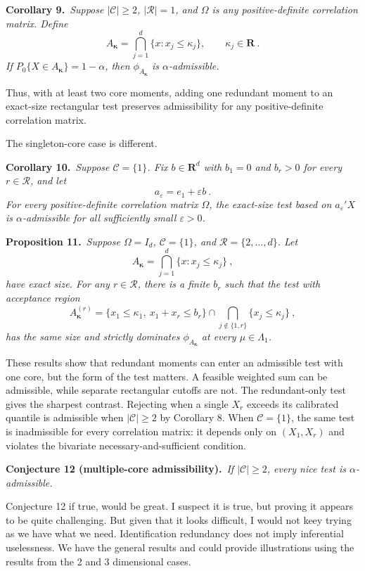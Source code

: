 \documentclass[11pt]{article}
\newcommand{\R}{\mathbf R}
\newcommand{\cC}{\mathcal C}
\newcommand{\cR}{\mathcal R}
\newcommand{\1}{\mathbf 1}
\newcommand{\result}[2]{%
  \par\medskip\noindent
  \begingroup\color{navy}\textbf{#1.}\endgroup\ \emph{#2}\par\smallskip}
\begin{document}
\result{Corollary 9}{Suppose $|\cC|\ge2$, $|\cR|=1$, and $\Omega$ is any
positive-definite correlation matrix. Define
\[
A_{\bm\kappa}=\bigcap_{j=1}^d\{x:x_j\le\kappa_j\},
\qquad \kappa_j\in\R~.
\]
If $P_0\{X\in A_{\bm\kappa}\}=1-\alpha$, then $\phi_{A_{\bm\kappa}}$ is
$\alpha$-admissible.}

Thus, with at least two core moments, adding one redundant moment to an exact-size rectangular test preserves admissibility for any positive-definite correlation matrix.

The singleton-core case is different.

\result{Corollary 10}{Suppose $\cC=\{1\}$. Fix $b\in\R^d$ with $b_1=0$ and
$b_r>0$ for every $r\in\cR$, and let
\[
a_\varepsilon=e_1+\varepsilon b~.
\]
For every positive-definite correlation matrix $\Omega$, the exact-size test
based on $a_\varepsilon'X$ is $\alpha$-admissible for all sufficiently small
$\varepsilon>0$.}

\result{Proposition 11}{Suppose $\Omega=I_d$, $\cC=\{1\}$, and
$\cR=\{2,\ldots,d\}$. Let
\[
A_{\bm\kappa}=\bigcap_{j=1}^d\{x:x_j\le\kappa_j\}~,
\]
have exact size. For any $r\in\cR$, there is a finite $b_r$ such that the
test with acceptance region
\[
A_{\bm\kappa}^{(r)}
=
\{x_1\le\kappa_1,\ x_1+x_r\le b_r\}
\cap
\bigcap_{j\notin\{1,r\}}\{x_j\le\kappa_j\}~,
\]
has the same size and strictly dominates $\phi_{A_{\bm\kappa}}$ at every
$\mu\in\Lambda_1$.}

These results show that redundant moments can enter an admissible test with
one core, but the form of the test matters.  A feasible weighted sum can be
admissible, while separate rectangular cutoffs are not.  The redundant-only
test gives the sharpest contrast.  Rejecting when a single $X_r$ exceeds its
calibrated quantile is admissible when $|\cC|\ge2$ by Corollary 8.  When
$\cC=\{1\}$, the same test is inadmissible for every correlation matrix: it
depends only on $(X_1,X_r)$ and violates the bivariate necessary-and-sufficient
condition.

\result{Conjecture 12 (multiple-core admissibility)}{If $|\cC|\ge2$, every
nice test is $\alpha$-admissible.}

Conjecture 12 if true, would be great. I suspect it is true, but proving it appears to be quite challenging. But given that it looks difficult, I would not keey trying as we have what we need. Identification redundancy
does not imply inferential uselessness. We have the general results and could provide illustrations using the results from the 2 and 3 dimensional cases.
\end{document}
